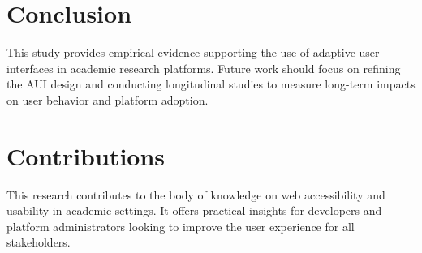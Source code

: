 \documentclass{article}
\begin{document}
\section{Conclusion}
This study provides empirical evidence supporting the use of adaptive user interfaces in academic research platforms. Future work should focus on refining the AUI design and conducting longitudinal studies to measure long-term impacts on user behavior and platform adoption.

\section{Contributions}
This research contributes to the body of knowledge on web accessibility and usability in academic settings. It offers practical insights for developers and platform administrators looking to improve the user experience for all stakeholders.



\end{document}
